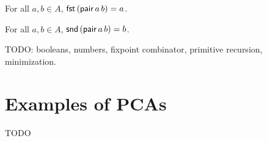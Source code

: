 \begin{proposition}
  \label{prop:equal-fst-pair}
  \leanok
  For all $a, b \in A$, $\mathsf{fst} \, (\mathsf{pair} \, a \, b) = a$.
\end{proposition}

\begin{proposition}
  \label{prop:equal-fst-pair}
  \leanok
  For all $a, b \in A$, $\mathsf{snd} \, (\mathsf{pair} \, a \, b) = b$.
\end{proposition}

TODO: booleans, numbers, fixpoint combinator, primitive recursion, minimization.

\section{Examples of PCAs}

TODO

